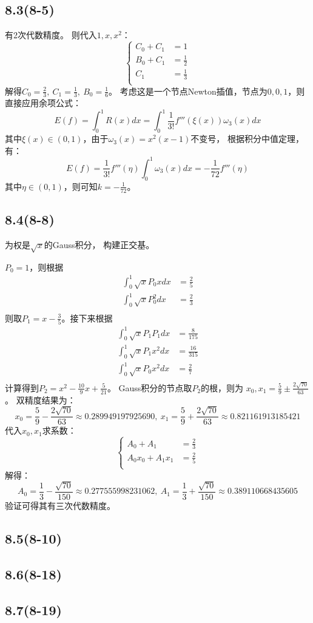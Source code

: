 \documentclass[UTF8,zihao=5]{ctexart}
\begin{document}
\subsection*{8.3(8-5)}
有2次代数精度。
则代入$1,x,x^2$：
$$
    \left\{
    \begin{array}{rl}
        C_0+C_1 & = 1          \\
        B_0+C_1 & =\frac{1}{2} \\
        C_1     & =\frac{1}{3} \\
    \end{array}
    \right.
$$
解得$C_0=\frac{2}{3},\ C_1=\frac{1}{3},\ B_0=\frac{1}{6}$。
考虑这是一个节点Newton插值，节点为$0,0,1$，则直接应用余项公式：
$$
    E(f)=\int_0^1{
    R(x)dx
    }=\int_0^1{
    \frac{1}{3!}f'''(\xi(x))\omega_3(x)dx
    }
$$
其中$\xi(x)\in(0,1)$，由于$\omega_3(x)=x^2(x-1)$不变号，
根据积分中值定理，有：
$$
    E(f)=\frac{1}{3!}f'''(\eta)\int_0^1{
    \omega_3(x)dx
    }
    =-\frac{1}{72}f'''(\eta)
$$
其中$\eta\in(0,1)$，则可知$k=-\frac{1}{72}$。




\subsection*{8.4(8-8)}
为权是$\sqrt{x}$的Gauss积分，
构建正交基。

$P_0=1$，则根据
$$
    \begin{aligned}
        \int_0^1{\sqrt{x}P_0x dx}  & = \frac{2}{5} \\
        \int_0^1{\sqrt{x}P_0^2 dx} & = \frac{2}{3} \\
    \end{aligned}
$$
则取$P_1=x-\frac{3}{5}$。接下来根据
$$
    \begin{aligned}
        \int_0^1{\sqrt{x}P_1P_1 dx} & = \frac{8}{175}  \\
        \int_0^1{\sqrt{x}P_1x^2 dx} & = \frac{16}{315} \\
        \int_0^1{\sqrt{x}P_0x^2 dx} & = \frac{2}{7}    \\
    \end{aligned}
$$
计算得到$P_2=x^2-\frac{10}{9}x+\frac{5}{21}$。
Gauss积分的节点取$P_2$的根，则为
$x_0,x_1=\frac{5}{9}\pm\frac{2\sqrt{70}}{63}$。
双精度结果为：
$$
    x_0=\frac{5}{9}-\frac{2\sqrt{70}}{63}\approx0.289949197925690,\
    x_1=\frac{5}{9}+\frac{2\sqrt{70}}{63}\approx0.821161913185421
$$
代入$x_0,x_1$求系数：
$$
    \left\{
    \begin{array}{rl}
        A_0+A_1       & = \frac{2}{3} \\
        A_0x_0+A_1x_1 & =\frac{2}{5}  \\
    \end{array}
    \right.
$$
解得：
$$
    A_0=\frac{1}{3}-\frac{\sqrt{70}}{150}\approx 0.277555998231062,\ 
    A_1=\frac{1}{3}+\frac{\sqrt{70}}{150}\approx 0.389110668435605
$$
验证可得其有三次代数精度。




\subsection*{8.5(8-10)}

\subsection*{8.6(8-18)}

\subsection*{8.7(8-19)}
\end{document}
